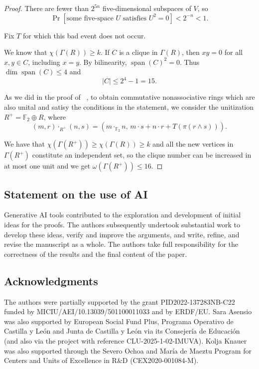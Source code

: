 \documentclass[a4paper,11pt]{amsart}
\theoremstyle{definition}
\newcommand{\Span}{\operatorname{span}}
\newcommand{\F}{\mathbb F}
\begin{document}
\begin{proof}
There are fewer than $2^{5n}$ five-dimensional subspaces of $V$, so 
\[
 \Pr[\text{some five-space }U\text{ satisfies }U^2=0]<2^{-n}<1.
\]


Fix $T$ for which this bad event does not occur.

We know that $\chi(\Gamma(R))\ge k$.  If $C$ is a clique in $\Gamma(R)$,
then $xy=0$ for all $x,y\in C$, including $x=y$.  By bilinearity,
$\Span(C)^2=0$.  Thus $\dim\Span(C)\le4$ and
\[
 |C|\le2^4-1=15.
\] 

As we did in the proof of ~, to obtain commutative nonassociative rings which are also unital and satisy the conditions in the statement, we consider the unitization $R^+=\F_2\oplus R$, where \[(m,r)\cdot_{R^+}(n,s)=(m\cdot_{\mathbb F_2}n,\,m\cdot s+n\cdot r+T(\pi(r\wedge s))).\]

We have that $\chi(\Gamma(R^+))\geq\chi(\Gamma(R))\geq k$ and all the new vertices in $\Gamma(R^+)$ constitute an independent set, so the clique number can be increased in at most one unit and we get $\omega(\Gamma(R^+))\leq 16$.
\end{proof}

\subsection*{Statement on the use of AI} Generative AI tools contributed to the exploration and development of initial ideas for the proofs. The authors subsequently undertook substantial work to develop these ideas, verify and improve the arguments, and write, refine, and revise the manuscript as a whole. The authors take full responsibility for the correctness of the results and the final content of the paper.


\subsection*{Acknowledgments}
The authors were partially supported by the grant PID2022-137283NB-C22 funded by MICIU/AEI/10.13039/501100011033 and by ERDF/EU. Sara Asensio was also supported by European Social Fund Plus, Programa Operativo de Castilla y León and Junta de Castilla y León via its Consejería de Educación (and also via the project with reference CLU-2025-1-02-IMUVA). Kolja Knauer was also supported through the Severo Ochoa and Mar\'ia de Maeztu Program for Centers and Units of Excellence in R\&D (CEX2020-001084-M).


\small


\end{document}
